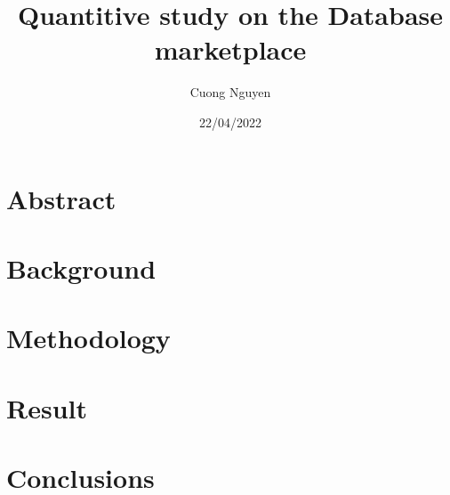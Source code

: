 \documentclass{article}
\title{Quantitive study on the Database marketplace}
\author{Cuong Nguyen}
\date{22/04/2022}
\begin{document}
    
\maketitle

\tableofcontents

\section{Abstract}\label{sec:abstract}

\section{Background}\label{sec:background}

\section{Methodology}\label{sec:method}

\section{Result}\label{sec:result}

\section{Conclusions}\label{sec:conclusion}

\printbibliography{}
\end{document}
